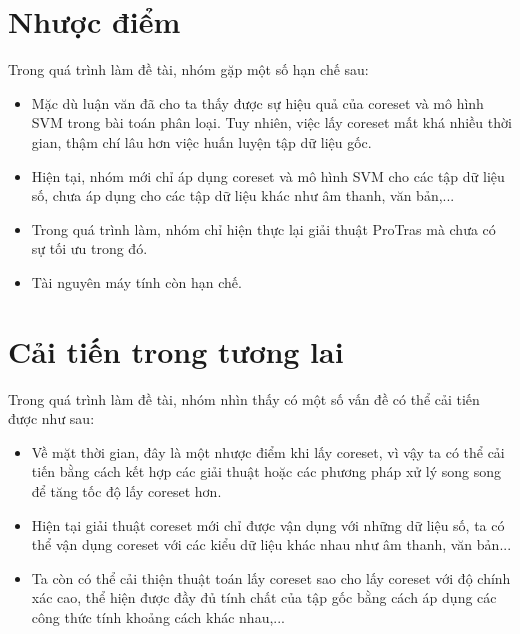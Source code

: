 \documentclass[a4paper, 12pt, oneside]{report}
\begin{document}
\section{Nhược điểm}
Trong quá trình làm đề tài, nhóm gặp một số hạn chế sau:
\begin{itemize}
    \item Mặc dù luận văn đã cho ta thấy được sự hiệu quả của coreset và mô hình SVM trong bài toán phân loại. Tuy nhiên, việc lấy coreset mất khá nhiều thời gian, thậm chí lâu hơn việc huấn luyện tập dữ liệu gốc.
    \item Hiện tại, nhóm mới chỉ áp dụng coreset và mô hình SVM cho các tập dữ liệu số, chưa áp dụng cho các tập dữ liệu khác như âm thanh, văn bản,...
    \item Trong quá trình làm, nhóm chỉ hiện thực lại giải thuật ProTras mà chưa có sự tối ưu trong đó.
    \item Tài nguyên máy tính còn hạn chế.
\end{itemize}
\section{Cải tiến trong tương lai}
Trong quá trình làm đề tài, nhóm nhìn thấy có một số vấn đề có thể cải tiến được như sau:
\begin{itemize}
    \item Về mặt thời gian, đây là một nhược điểm khi lấy coreset, vì vậy ta có thể cải tiến bằng cách kết hợp các giải thuật hoặc các phương pháp xử lý song song để tăng tốc độ lấy coreset hơn.
    \item Hiện tại giải thuật coreset mới chỉ được vận dụng với những dữ liệu số, ta có thể vận dụng coreset với các kiểu dữ liệu khác nhau như âm thanh, văn bản...
    \item Ta còn có thể cải thiện thuật toán lấy coreset sao cho lấy coreset với độ chính xác cao, thể hiện được đầy đủ tính chất của tập gốc bằng cách áp dụng các công thức tính khoảng cách khác nhau,... 
\end{itemize}
\end{document}
